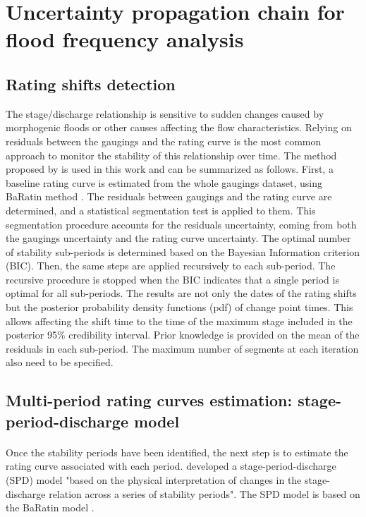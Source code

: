 \documentclass[11pt]{article}
\begin{document}
\section{Uncertainty propagation chain for flood frequency analysis}
     \subsection{Rating shifts detection}
     \label{subsec:RatingShifts}
    
    The stage/discharge relationship is sensitive to sudden changes caused by morphogenic floods or other causes affecting the flow characteristics. Relying on residuals between the gaugings and the rating curve is the most common approach to monitor the stability of this relationship over time. The method proposed by \citet{darienzo_detection_2021} is used in this work and can be summarized as follows. First, a baseline rating curve is estimated from the whole gaugings dataset, using BaRatin method \citep{le_coz_combining_2014}. The residuals between gaugings and the rating curve are determined, and a statistical segmentation test is applied to them. This segmentation procedure accounts for the residuals uncertainty, coming from both the gaugings uncertainty and the rating curve uncertainty. The optimal number of stability sub-periods is determined based on the Bayesian Information criterion (BIC). Then, the same steps are applied recursively to each sub-period. The recursive procedure is stopped when the BIC indicates that a single period is optimal for all sub-periods. The results are not only the dates of the rating shifts but the posterior probability density functions (pdf) of change point times. This allows affecting the shift time to the time of the maximum stage included in the posterior 95\% credibility interval. Prior knowledge is provided on the mean of the residuals in each sub-period. The maximum number of segments at each iteration also need to be specified.
    
    \subsection{Multi-period rating curves estimation: stage-period-discharge model}
    \label{subsec:RC_SPD}
    \paragraph{}
    Once the stability periods have been identified, the next step is to estimate the rating curve associated with each period. \citet{mansanarez_shift_2019} developed a stage-period-discharge (SPD) model "based on the physical interpretation of changes in the stage-discharge relation across a series of stability periods". The SPD model is based on the BaRatin model \citep{le_coz_combining_2014}.
\end{document}
